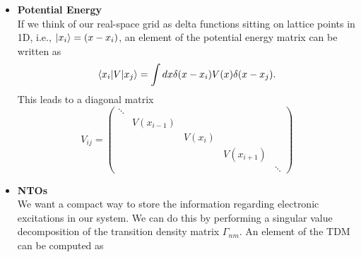 \documentclass[20pt,margin=1in,innermargin=-4.5in,blockverticalspace=-0.25in]{tikzposter}
\newcommand{\bem}{\begin{pmatrix}}
\newcommand{\enm}{\end{pmatrix}}
\begin{document}
\begin{columns}
{\begin{itemize}
        \begin{equation}
          - \frac{\hbar^2}{2m} \frac{\partial^2}{\partial x^2} \psi = - \frac{\hbar^2}{2m} \frac{1}{\Delta^2} \bem -2 & 1 & 0 & 0 & 0 & \cdots \\ 1 & -2 & 1 & 0 & 0 & \cdots \\ 0 & 1 & -2 & 1 & 0 & \cdots \\ 0 & 0 & 1 & -2 & 1 & \cdots \\ & & \vdots & & & \enm \bem \vdots \\ f(x_{i-1}) \\ f(x_i) \\ f(x_{i+1}) \\ \vdots \enm
        \end{equation}
        \item \textbf{Potential Energy}\\
        If we think of our real-space grid as delta functions sitting on lattice points in 1D, i.e., $\ket{x_i} = (x - x_i)$, an element of the potential energy matrix can be written as
        \begin{equation}
          \braket{x_i | V | x_j} = \int dx \delta(x - x_i) V(x) \delta(x - x_j) .
        \end{equation}
        This leads to a diagonal matrix
        \begin{equation}
          V_{ij} = \bem \ddots & & & & \\ & V(x_{i-1}) & & & \\ & & V(x_{i}) & & \\ & & & V(x_{i+1}) & \\ & & & & \ddots \enm
        \end{equation}
        \item \textbf{NTOs}\\
        We want a compact way to store the information regarding electronic excitations in our system. We can do this by performing a singular value decomposition of the transition density matrix $\Gamma_{nm}$. An element of the TDM can be computed as
      \end{itemize}
    }

\end{columns}
\end{document}
